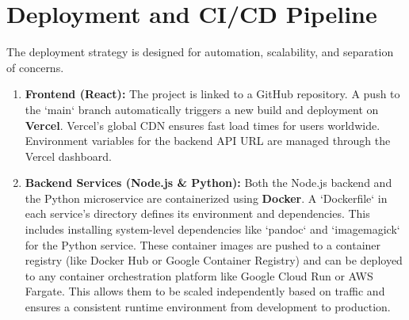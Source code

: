\section{Deployment and CI/CD Pipeline}
\label{sec:impl-deployment}
The deployment strategy is designed for automation, scalability, and separation of concerns.
\begin{enumerate}
    \item \textbf{Frontend (React):} The project is linked to a GitHub repository. A push to the `main` branch automatically triggers a new build and deployment on \textbf{Vercel}. Vercel's global CDN ensures fast load times for users worldwide. Environment variables for the backend API URL are managed through the Vercel dashboard.
    
    \item \textbf{Backend Services (Node.js \& Python):} Both the Node.js backend and the Python microservice are containerized using \textbf{Docker}. A `Dockerfile` in each service's directory defines its environment and dependencies. This includes installing system-level dependencies like `pandoc` and `imagemagick` for the Python service. These container images are pushed to a container registry (like Docker Hub or Google Container Registry) and can be deployed to any container orchestration platform like Google Cloud Run or AWS Fargate. This allows them to be scaled independently based on traffic and ensures a consistent runtime environment from development to production.
\end{enumerate}